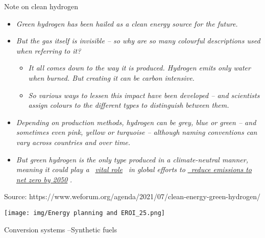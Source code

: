 \begin{frame}{Note on clean hydrogen}
\label{note-on-clean-hydrogen}
\begin{itemize}
\tightlist
\item
  \emph{Green hydrogen has been hailed as a clean energy source for the
  future. }
\item
  \emph{But the gas itself is invisible -- so why are so many colourful
  descriptions used when referring to it?}

  \begin{itemize}
  \tightlist
  \item
    \emph{It all comes down to the way it is produced. Hydrogen emits
    only water when burned. But creating it can be carbon intensive.}
  \item
    \emph{So various ways to lessen this impact have been developed --
    and scientists assign colours to the different types to distinguish
    between them.}
  \end{itemize}
\item
  \emph{Depending on production methods, hydrogen can be grey, blue or
  green -- and sometimes even pink, yellow or turquoise -- although
  naming conventions can vary across countries and over time.}
\item
  { \emph{But green hydrogen is the only type produced in a
  climate-neutral manner, meaning it could play a~} } {
  \emph{\href{https://www.iea.org/reports/the-future-of-hydrogen}{vital
  role}} } { \emph{~in global efforts to} } {
  \emph{\href{https://www.un.org/en/climatechange/net-zero-coalition}{~reduce
  emissions to net zero by 2050}} } { \emph{.} }
\end{itemize}

Source:
https://www.weforum.org/agenda/2021/07/clean-energy-green-hydrogen/

\texttt{[image: img/Energy planning and EROI\_25.png]}
\end{frame}

\begin{frame}{Conversion systems --Synthetic fuels}
\label{conversion-systems-synthetic-fuels}
\end{frame}

